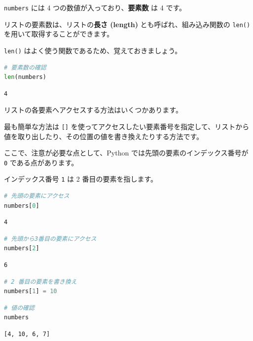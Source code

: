 \texttt{numbers} には 4 つの数値が入っており、\textbf{要素数} は 4 です。

リストの要素数は、リストの\textbf{長さ (length)} とも呼ばれ、組み込み関数の \texttt{len()} を用いて取得することができます。

\texttt{len()} はよく使う関数であるため、覚えておきましょう。


\begin{lstlisting}[style=codecell,language=Python]
# 要素数の確認
len(numbers)
\end{lstlisting}

\begin{lstlisting}[style=outputcell]
4
\end{lstlisting}

リストの各要素へアクセスする方法はいくつかあります。

最も簡単な方法は \texttt{[]} を使ってアクセスしたい要素番号を指定して、リストから値を取り出したり、その位置の値を書き換えたりする方法です。

ここで、注意が必要な点として、Python では先頭の要素のインデックス番号が \texttt{0} である点があります。

インデックス番号 \texttt{1} は 2 番目の要素を指します。


\begin{lstlisting}[style=codecell,language=Python]
# 先頭の要素にアクセス
numbers[0]
\end{lstlisting}

\begin{lstlisting}[style=outputcell]
4
\end{lstlisting}

\begin{lstlisting}[style=codecell,language=Python]
# 先頭から3番目の要素にアクセス
numbers[2]
\end{lstlisting}

\begin{lstlisting}[style=outputcell]
6
\end{lstlisting}

\begin{lstlisting}[style=codecell,language=Python]
# 2 番目の要素を書き換え
numbers[1] = 10
\end{lstlisting}

\begin{lstlisting}[style=codecell,language=Python]
# 値の確認
numbers
\end{lstlisting}

\begin{lstlisting}[style=outputcell]
[4, 10, 6, 7]
\end{lstlisting}

